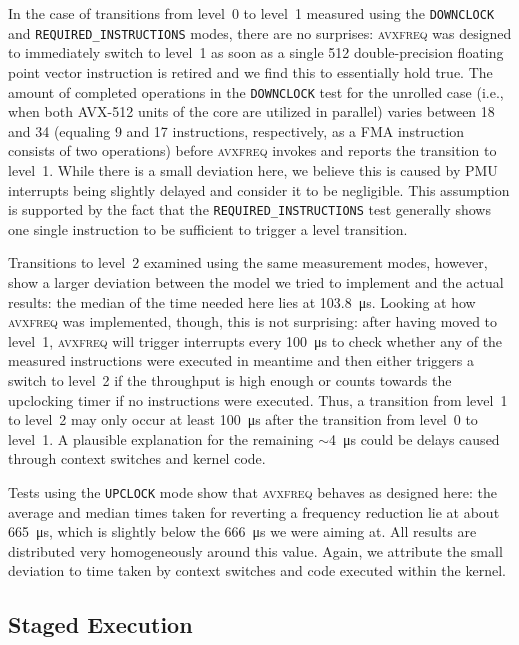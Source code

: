 In the case of transitions from level~0 to level~1 measured using the \texttt{DOWNCLOCK} and \texttt{REQUIRED\_INSTRUCTIONS} modes, there are no surprises: \textsc{avxfreq} was designed to immediately switch to level~1 as soon as a single \SI{512}{\bit} double-precision floating point vector instruction is retired and we find this to essentially hold true. The amount of completed operations in the \texttt{DOWNCLOCK} test for the unrolled case (i.e., when both \gls{AVX-512} units of the core are utilized in parallel) varies between 18 and 34 (equaling 9 and 17 instructions, respectively, as a \gls{FMA} instruction consists of two operations) before \textsc{avxfreq} invokes and reports the transition to level~1. While there is a small deviation here, we believe this is caused by \gls{PMU} interrupts being slightly delayed and consider it to be negligible. This assumption is supported by the fact that the \texttt{REQUIRED\_INSTRUCTIONS} test generally shows one single instruction to be sufficient to trigger a level transition.

Transitions to level~2 examined using the same measurement modes, however, show a larger deviation between the model we tried to implement and the actual results: the median of the time needed here lies at \SI{103.8}{\micro\second}. Looking at how \textsc{avxfreq} was implemented, though, this is not surprising: after having moved to level~1, \textsc{avxfreq} will trigger interrupts every \SI{100}{\micro\second} to check whether any of the measured instructions were executed in meantime and then either triggers a switch to level~2 if the throughput is high enough or counts towards the upclocking timer if no instructions were executed. Thus, a transition from level~1 to level~2 may only occur at least \SI{100}{\micro\second} after the transition from level~0 to level~1. A plausible explanation for the remaining $\sim$\SI{4}{\micro\second} could be delays caused through context switches and kernel code. %

Tests using the \texttt{UPCLOCK} mode show that \textsc{avxfreq} behaves as designed here: the average and median times taken for reverting a frequency reduction lie at about \SI{665}{\micro\second}, which is slightly below the \SI{666}{\micro\second} we were aiming at. All results are distributed very homogeneously around this value. Again, we attribute the small deviation to time taken by context switches and code executed within the kernel.

\subsection{Staged Execution}
\label{sec:evaluation:results:stagedexecution}

